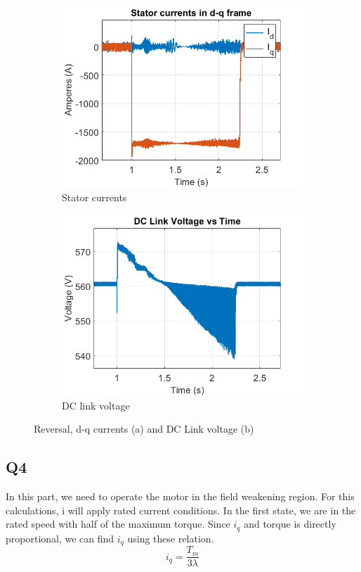 \begin{figure}[H]
        \centering
        \begin{subfigure}[b]{0.475\textwidth}
            \centering
            \includegraphics[width = 8 cm]{figs/reverse_dq.png}
            \caption{Stator currents}
            \label{fig:sc}
        \end{subfigure}
        \hfill
        \begin{subfigure}[b]{0.475\textwidth}  
            \centering 
            \includegraphics[width = 8 cm]{figs/reverse_dc.png}
            \caption{DC link voltage}
            \label{fig:dc}
        \end{subfigure}
        \caption{Reversal, d-q currents (a) and DC Link voltage (b)}
        \label{fig:dc}
        \end{figure}        




\subsection{Q4}

In this part, we need to operate the motor in the field weakening region. For this calculations, i will apply rated current conditions. In the first state, we are in the rated speed with half of the maximum torque. Since $i_q$ and torque is directly proportional, we can find $i_q$ using these relation. 
\begin{equation}
     i_q = \dfrac{T_{m}}{3 \lambda }
\end{equation}


